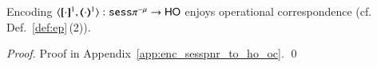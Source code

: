 \begin{comment}
			 In the second sub-case, $x$ stands for a shared name. Then we have the following typing in the source language:
			{\small
			\[
			 \tree{
				 \Gamma \cat x:\chtype{S_1} ; \emptyset; \Sigma  \cat k:S \proves   Q \hastype \Proc
			 	}{
				\Gamma ; \emptyset; \Sigma  \cat k:\btinp{\chtype{S_1}}S \proves  \binp{k}{x} Q \hastype \Proc}
			 \]
			 }
			 The typing in the target language is derived similarly as in the first sub-case.	
\end{enumerate}
%
\qed
\end{proof}
\end{comment}

\begin{proposition}\rm
	Encoding $\encod{\cdot}{\cdot}{1}: \sespnr \to \HO$  enjoys operational correspondence (cf. Def.~\ref{def:ep}\,(2)).
\end{proposition}


\begin{proof}
	Proof in Appendix~\ref{app:enc_sesspnr_to_ho_oc}.
	\qed
\end{proof}

\begin{comment}
\begin{proof}[Sketch]
	We must show completeness and soundness properties. 
	For completeness, it suffices to consider source process
	$P_0 = \bout{k}{k'} P \Par \binp{k}{x} Q$. We have that
%
	\[
		P_0 \red P \Par Q\subst{k'}{x}.
	\]
%
	By the definition of encoding we have:
	\begin{eqnarray*}
		\pmap{P_0}{1} & = & \bbout{k}{ \abs{z}{\,\binp{z}{X} \appl{X}{k'}} } \pmap{P}{1} \Par \binp{k}{X} \newsp{s}{\appl{X}{s} \Par \bbout{\dual{s}}{\abs{x} \pmap{Q}{1}} \inact}  \\
		& \red & \pmap{P}{1} \Par \newsp{s}{\appl{X}{s} \subst{\abs{z}{\,\binp{z}{X} \appl{X}{k'}}}{X} \Par \bbout{\dual{s}}{\abs{x} \pmap{Q}{1}} \inact} \\
		& = & \pmap{P}{1} \Par \newsp{s}{\,\binp{s}{X} \appl{X}{k'} \Par \bbout{\dual{s}}{\abs{x} \pmap{Q}{1}} \inact} \\
		& \red & \pmap{P}{1} \Par \appl{X}{k'} \subst{\abs{x} \pmap{Q}{1}}{X} \Par \inact \\
		& \scong & \pmap{P}{1} \Par \pmap{Q}{1}\subst{k'}{x}  
	\end{eqnarray*}
	For soundness, it suffices to notice that the encoding does not add new visible actions:
	the additional synchronizations induced by the encoding always occur on private (fresh) names.
	We assume weak bisimilarities, which abstract from internal actions used by the encoding,
	and so  constructing a relation witnessing behavioral equivalence is easy.
	\qed
\end{proof}
\end{comment}

